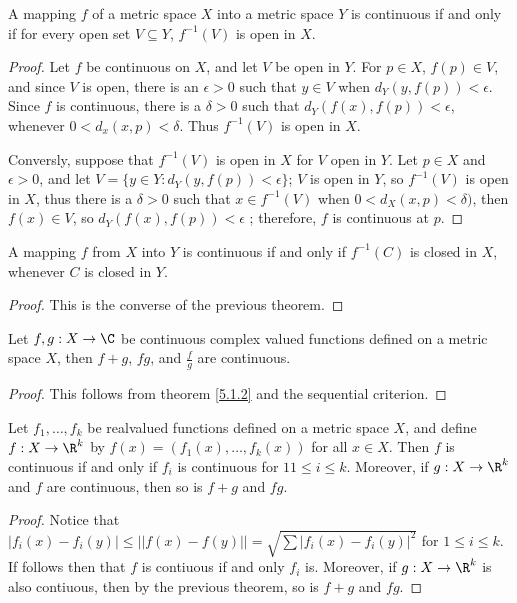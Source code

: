 \begin{theorem}\label{5.2.3}
    A mapping $f$ of a metric space  $X$ into a metric space  $Y$ is continuous if and 
    only if  for every open set $V \subseteq Y$,  $f^{-1}(V)$ is open in  $X$.
\end{theorem}
\begin{proof}
    Let $f$ be continuous on  $X$, and let  $V$ be open in  $Y$. For  $p \in X$, $f(p) \in V$, 
    and since  $V$ is open, there is an  $\epsilon>0$ such that  $y \in V$ when $d_Y(y,f(p))<\epsilon$. 
    Since  $f$ is continuous, there is a  $\delta>0$ such that  $d_Y(f(x),f(p))<\epsilon$, whenever 
    $0<d_x(x,p)<\delta$. Thus  $f^{-1}(V)$ is open in  $X$.

    Conversly, suppose that $f^{-1}(V)$ is open in  $X$ for  $V$ open in  $Y$. Let  
    $p \in X$ and  $\epsilon>0$, and let  $V=\{y \in Y: d_Y(y,f(p))<\epsilon\}$;  $V$ is open in  $Y$, 
    so  $f^{-1}(V)$ is open in  $X$, thus there is a  $\delta>0$ such that $x \in f^{-1}(V)$ when 
    $0<d_X(x,p)<\delta)$, then $f(x) \in V$, so $d_Y(f(x),f(p))<\epsilon$ ; therefore, $f$ is continuous 
    at  $p$.
\end{proof}

\begin{corollary}
    A mapping $f$ from  $X$ into  $Y$ is continuous if and only if  $f^{-1}(C)$ is closed 
    in $X$, whenever  $C$ is closed in  $Y$.
\end{corollary}
\begin{proof}
    This is the converse of the previous theorem.		
\end{proof}

\begin{theorem}\label{5.2.4}
    Let $f,g:X \rightarrow \C$ be continuous complex valued functions defined on a 
    metric space  $X$, then $f+g$, $fg$, and $\frac{f}{g}$ are continuous.
\end{theorem}
\begin{proof}
    This follows from theorem \ref{5.1.2} and the sequential criterion.
\end{proof}

\begin{theorem}\label{5.2.5}
    Let $f_1, \dots, f_k$ be realvalued functions defined on a metric space $X$, and define 
    $f:X \rightarrow \R^k$ by  $f(x)=(f_1(x), \dots, f_k(x))$ for all $x \in X$. Then $f$ is continuous 
    if and only if  $f_i$ is continuous for  $11 \leq i \leq k$. Moreover, if  $g:X \rightarrow \R^k$ and 
     $f$ are continuous, then so is  $f+g$ and  $fg$.
\end{theorem}
\begin{proof}
    Notice that $|f_i(x)-f_i(y)| \leq ||f(x)-f(y)||=\sqrt{\sum{|f_i(x)-f_i(y)|^2}}$	for 
    $1 \leq i \leq k$. If follows then that  $f$ is contiuous if and only  $f_i$ is. Moreover, 
    if  $g:X \rightarrow \R^k$  is also contiuous, then by the previous theorem, so is $f+g$ and  $fg$.
\end{proof}

